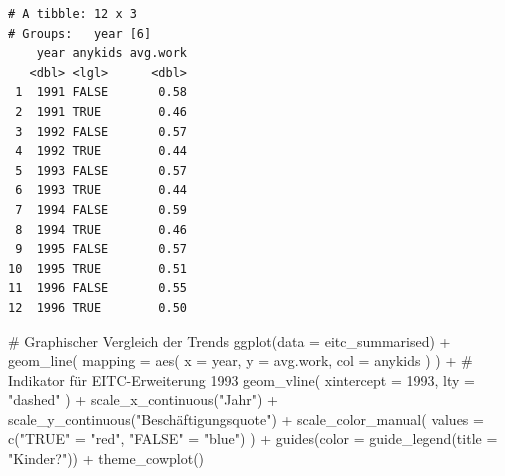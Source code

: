 \documentclass[
  a4paper,
  DIV=11,
  oneside]{scrreprt}
\newenvironment{Shaded}{\begin{snugshade}}{\end{snugshade}}
\newcommand{\AttributeTok}[1]{\textcolor[rgb]{0.40,0.45,0.13}{#1}}
\newcommand{\CommentTok}[1]{\textcolor[rgb]{0.37,0.37,0.37}{#1}}
\newcommand{\DecValTok}[1]{\textcolor[rgb]{0.68,0.00,0.00}{#1}}
\newcommand{\FunctionTok}[1]{\textcolor[rgb]{0.28,0.35,0.67}{#1}}
\newcommand{\NormalTok}[1]{\textcolor[rgb]{0.00,0.23,0.31}{#1}}
\newcommand{\OtherTok}[1]{\textcolor[rgb]{0.00,0.23,0.31}{#1}}
\newcommand{\SpecialCharTok}[1]{\textcolor[rgb]{0.37,0.37,0.37}{#1}}
\newcommand{\StringTok}[1]{\textcolor[rgb]{0.13,0.47,0.30}{#1}}
\begin{document}
\begin{verbatim}
# A tibble: 12 x 3
# Groups:   year [6]
    year anykids avg.work
   <dbl> <lgl>      <dbl>
 1  1991 FALSE       0.58
 2  1991 TRUE        0.46
 3  1992 FALSE       0.57
 4  1992 TRUE        0.44
 5  1993 FALSE       0.57
 6  1993 TRUE        0.44
 7  1994 FALSE       0.59
 8  1994 TRUE        0.46
 9  1995 FALSE       0.57
10  1995 TRUE        0.51
11  1996 FALSE       0.55
12  1996 TRUE        0.50
\end{verbatim}

\begin{Shaded}
\begin{Highlighting}[]
\CommentTok{\# Graphischer Vergleich der Trends}
\FunctionTok{ggplot}\NormalTok{(}\AttributeTok{data =}\NormalTok{ eitc\_summarised) }\SpecialCharTok{+}
  \FunctionTok{geom\_line}\NormalTok{(}
    \AttributeTok{mapping =} \FunctionTok{aes}\NormalTok{(}
      \AttributeTok{x =}\NormalTok{ year, }
      \AttributeTok{y =}\NormalTok{ avg.work, }
      \AttributeTok{col =}\NormalTok{ anykids}
\NormalTok{    )}
\NormalTok{  ) }\SpecialCharTok{+}
  \CommentTok{\# Indikator für EITC{-}Erweiterung 1993}
  \FunctionTok{geom\_vline}\NormalTok{(}
    \AttributeTok{xintercept =} \DecValTok{1993}\NormalTok{, }
    \AttributeTok{lty =} \StringTok{"dashed"}
\NormalTok{  ) }\SpecialCharTok{+}
  \FunctionTok{scale\_x\_continuous}\NormalTok{(}\StringTok{"Jahr"}\NormalTok{) }\SpecialCharTok{+}
  \FunctionTok{scale\_y\_continuous}\NormalTok{(}\StringTok{"Beschäftigungsquote"}\NormalTok{) }\SpecialCharTok{+}
  \FunctionTok{scale\_color\_manual}\NormalTok{(}
    \AttributeTok{values =} \FunctionTok{c}\NormalTok{(}\StringTok{"TRUE"} \OtherTok{=} \StringTok{"red"}\NormalTok{, }\StringTok{"FALSE"} \OtherTok{=} \StringTok{"blue"}\NormalTok{)}
\NormalTok{  ) }\SpecialCharTok{+}
  \FunctionTok{guides}\NormalTok{(}\AttributeTok{color =} \FunctionTok{guide\_legend}\NormalTok{(}\AttributeTok{title =} \StringTok{"Kinder?"}\NormalTok{)) }\SpecialCharTok{+}
  \FunctionTok{theme\_cowplot}\NormalTok{()}
\end{Highlighting}
\end{Shaded}
\end{document}
